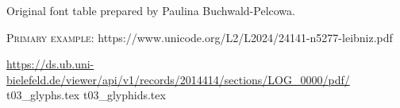 \documentclass[12pt]{article}
\newcommand{\bg}{\begingl}
\begin{document}
\begin{flushleft}
\noindent
{}
    \label{fig:t01b}

    
    \medskip

      Original font table prepared by Paulina Buchwald-Pelcowa.

      \bigskip

      \textsc{Primary example:}
https://www.unicode.org/L2/L2024/24141-n5277-leibniz.pdf



      
\url{https://ds.ub.uni-bielefeld.de/viewer/api/v1/records/2014414/sections/LOG_0000/pdf/}
 {t03_glyphs.tex}
 {t03_glyphids.tex}


\end{flushleft}
\end{document}
